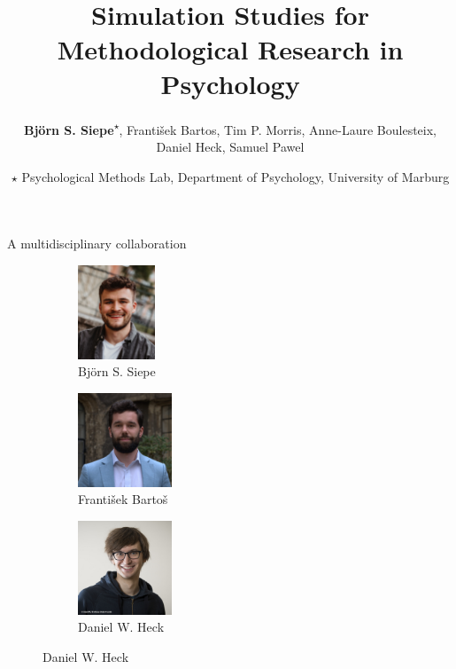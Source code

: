 \documentclass[english, 12pt, aspectratio=169]{beamer}
\date{$\star$ Psychological Methods Lab, Department of Psychology, University of Marburg}
\title{~\\ ~ \\ \textbf{Simulation Studies for Methodological Research in Psychology}}
\author{\textbf{Björn S. Siepe}\textsuperscript{$\star$}, František Bartos, Tim P. Morris, Anne-Laure Boulesteix, Daniel Heck, Samuel Pawel}
\institute{
  DagStat2025. Slides available at \url{htpps://bsiepe.github.io}
}
\begin{document}



\begin{frame}
  \titlepage
\nocite{PawelKookReeve2023}
\end{frame}

\begin{frame}{A multidisciplinary collaboration}
    \centering
    \begin{figure}
        \begin{subfigure}{0.27\textwidth}
            \centering
            \includegraphics[height=2.8cm,frame]{pics/bjoern_siepe.jpg}
            \caption*{Björn S. Siepe}
        \end{subfigure}
        \begin{subfigure}{0.27\textwidth}
            \centering
            \includegraphics[height=2.8cm,frame]{pics/frantisek_bartos.jpeg}
            \caption*{František Bartoš}
        \end{subfigure}
        \begin{subfigure}{0.27\textwidth}
          \centering
          \includegraphics[height=2.8cm,frame]{pics/daniel_heck.jpg}
            \caption*{Daniel W. Heck}
        \end{subfigure}


\end{figure}
\end{frame}
\end{document}
